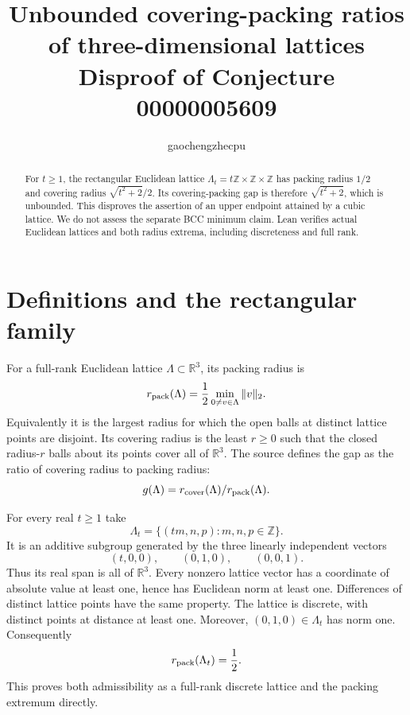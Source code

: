\documentclass[11pt]{article}
\title{Unbounded covering-packing ratios\\of three-dimensional lattices\\
\large Disproof of Conjecture 00000005609}
\author{gaochengzhecpu}\date{}
\begin{document}
\maketitle
\begin{abstract}
For $t\geq1$, the rectangular Euclidean lattice
$\Lambda_t=t\mathbb Z\times\mathbb Z\times\mathbb Z$
has packing radius $1/2$ and covering radius
$\sqrt{t^2+2}/2$. Its covering-packing gap is therefore
$\sqrt{t^2+2}$, which is unbounded. This disproves the
assertion of an upper endpoint attained by a cubic
lattice. We do not assess the separate BCC minimum
claim. Lean verifies actual Euclidean lattices and both
radius extrema, including discreteness and full rank.
\end{abstract}

\section*{Definitions and the rectangular family}
For a full-rank Euclidean lattice $\Lambda\subset\mathbb R^3$,
its packing radius is
\[
 r_{\rm pack}(\Lambda)=\frac12
     \min_{0\ne v\in\Lambda}\|v\|_2.
\]
Equivalently it is the largest radius for which the open
balls at distinct lattice points are disjoint. Its
covering radius is the least $r\geq0$ such that the
closed radius-$r$ balls about its points cover all of
$\mathbb R^3$. The source defines the gap as the ratio
of covering radius to packing radius:
\[
 g(\Lambda)=r_{\rm cover}(\Lambda)/r_{\rm pack}(\Lambda).
\]

For every real $t\geq1$ take
\[
 \Lambda_t=\{(tm,n,p):m,n,p\in\mathbb Z\}.
\]
It is an additive subgroup generated by the three
linearly independent vectors
\[
 (t,0,0),\qquad(0,1,0),\qquad(0,0,1).
\]
Thus its real span is all of $\mathbb R^3$.
Every nonzero lattice vector has a coordinate of
absolute value at least one, hence has Euclidean norm
at least one. Differences of distinct lattice points
have the same property. The lattice is discrete, with
distinct points at distance at least one. Moreover,
$(0,1,0)\in\Lambda_t$ has norm one. Consequently
\[
 r_{\rm pack}(\Lambda_t)=\frac12.
\]
This proves both admissibility as a full-rank discrete
lattice and the packing extremum directly.

\newpage
\end{document}
